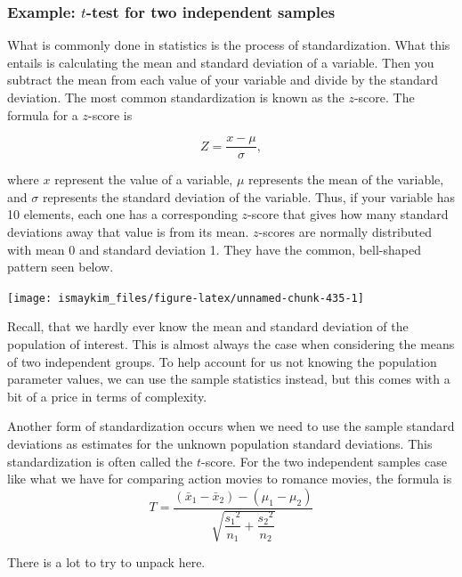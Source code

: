 \documentclass[12pt, krantz2,]{krantz}
\begin{document}
\hypertarget{example-t-test-for-two-independent-samples}{%
\subsubsection*{\texorpdfstring{Example: \(t\)-test for two independent samples}{Example: t-test for two independent samples}}\label{example-t-test-for-two-independent-samples}}


What is commonly done in statistics is the process of standardization. What this entails is calculating the mean and standard deviation of a variable. Then you subtract the mean from each value of your variable and divide by the standard deviation. The most common standardization is known as the \(z\)-score. The formula for a \(z\)-score is

\[Z = \frac{x - \mu}{\sigma},\]

where \(x\) represent the value of a variable, \(\mu\) represents the mean of the variable, and \(\sigma\) represents the standard deviation of the variable. Thus, if your variable has 10 elements, each one has a corresponding \(z\)-score that gives how many standard deviations away that value is from its mean. \(z\)-scores are normally distributed with mean 0 and standard deviation 1. They have the common, bell-shaped pattern seen below.

\begin{center}\texttt{[image: ismaykim\_files/figure-latex/unnamed-chunk-435-1]} \end{center}

Recall, that we hardly ever know the mean and standard deviation of the population of interest. This is almost always the case when considering the means of two independent groups. To help account for us not knowing the population parameter values, we can use the sample statistics instead, but this comes with a bit of a price in terms of complexity.

Another form of standardization occurs when we need to use the sample standard deviations as estimates for the unknown population standard deviations. This standardization is often called the \(t\)-score. For the two independent samples case like what we have for comparing action movies to romance movies, the formula is \[T =\dfrac{ (\bar{x}_1 - \bar{x}_2) - (\mu_1 - \mu_2)}{ \sqrt{\dfrac{{s_1}^2}{n_1} + \dfrac{{s_2}^2}{n_2}}  }\]

There is a lot to try to unpack here.
\end{document}
